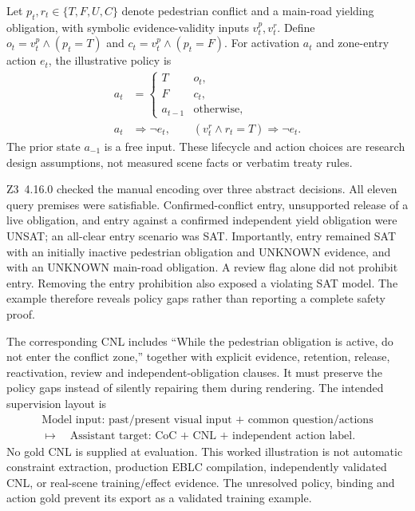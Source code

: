 Let $p_t,r_t\in\{T,F,U,C\}$ denote pedestrian conflict and a main-road yielding
obligation, with symbolic evidence-validity inputs $v^p_t,v^r_t$. Define
$o_t=v^p_t\land(p_t=T)$ and $c_t=v^p_t\land(p_t=F)$. For activation $a_t$
and zone-entry action $e_t$, the illustrative policy is
\begin{align}
 a_t &= \begin{cases}
 T & o_t,\\
 F & c_t,\\
 a_{t-1} & \text{otherwise},
 \end{cases} \\
 a_t &\Rightarrow \neg e_t, \qquad
 (v^r_t\land r_t=T)\Rightarrow\neg e_t.
\end{align}
The prior state $a_{-1}$ is a free input. These lifecycle and action choices are
research design assumptions, not measured scene facts or verbatim treaty rules.

Z3~4.16.0 checked the manual encoding over three abstract decisions. All eleven
query premises were satisfiable. Confirmed-conflict entry, unsupported release
of a live obligation, and entry against a confirmed independent yield obligation
were UNSAT; an all-clear entry scenario was SAT. Importantly, entry remained SAT
with an initially inactive pedestrian obligation and UNKNOWN evidence, and with
an UNKNOWN main-road obligation. A review flag alone did not prohibit entry.
Removing the entry prohibition also exposed a violating SAT model. The example
therefore reveals policy gaps rather than reporting a complete safety proof.

The corresponding CNL includes ``While the pedestrian obligation is active,
do not enter the conflict zone,'' together with explicit evidence, retention,
release, reactivation, review and independent-obligation clauses. It must preserve
the policy gaps instead of silently repairing them during rendering. The intended
supervision layout is
\begin{gather*}
 \text{Model input: past/present visual input + common question/actions}\\
 \longmapsto\quad\text{Assistant target: CoC + CNL + independent action label}.
\end{gather*}
No gold CNL is supplied at evaluation. This worked illustration is not automatic
constraint extraction, production EBLC compilation, independently validated CNL,
or real-scene training/effect evidence. The unresolved policy, binding and action
gold prevent its export as a validated training example.
